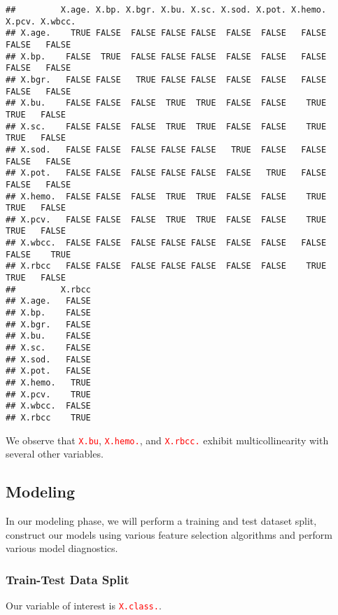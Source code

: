 \documentclass[
]{article}
\newenvironment{Shaded}{\begin{snugshade}}{\end{snugshade}}
\newcommand{\FunctionTok}[1]{\textcolor[rgb]{0.00,0.00,0.00}{#1}}
\newcommand{\NormalTok}[1]{#1}
\newcommand{\SpecialCharTok}[1]{\textcolor[rgb]{0.00,0.00,0.00}{#1}}
\begin{document}
\begin{verbatim}
##         X.age. X.bp. X.bgr. X.bu. X.sc. X.sod. X.pot. X.hemo. X.pcv. X.wbcc.
## X.age.    TRUE FALSE  FALSE FALSE FALSE  FALSE  FALSE   FALSE  FALSE   FALSE
## X.bp.    FALSE  TRUE  FALSE FALSE FALSE  FALSE  FALSE   FALSE  FALSE   FALSE
## X.bgr.   FALSE FALSE   TRUE FALSE FALSE  FALSE  FALSE   FALSE  FALSE   FALSE
## X.bu.    FALSE FALSE  FALSE  TRUE  TRUE  FALSE  FALSE    TRUE   TRUE   FALSE
## X.sc.    FALSE FALSE  FALSE  TRUE  TRUE  FALSE  FALSE    TRUE   TRUE   FALSE
## X.sod.   FALSE FALSE  FALSE FALSE FALSE   TRUE  FALSE   FALSE  FALSE   FALSE
## X.pot.   FALSE FALSE  FALSE FALSE FALSE  FALSE   TRUE   FALSE  FALSE   FALSE
## X.hemo.  FALSE FALSE  FALSE  TRUE  TRUE  FALSE  FALSE    TRUE   TRUE   FALSE
## X.pcv.   FALSE FALSE  FALSE  TRUE  TRUE  FALSE  FALSE    TRUE   TRUE   FALSE
## X.wbcc.  FALSE FALSE  FALSE FALSE FALSE  FALSE  FALSE   FALSE  FALSE    TRUE
## X.rbcc   FALSE FALSE  FALSE FALSE FALSE  FALSE  FALSE    TRUE   TRUE   FALSE
##         X.rbcc
## X.age.   FALSE
## X.bp.    FALSE
## X.bgr.   FALSE
## X.bu.    FALSE
## X.sc.    FALSE
## X.sod.   FALSE
## X.pot.   FALSE
## X.hemo.   TRUE
## X.pcv.    TRUE
## X.wbcc.  FALSE
## X.rbcc    TRUE
\end{verbatim}

We observe that \textcolor{red}{\texttt{X.bu}},
\textcolor{red}{\texttt{X.hemo.}}, and \textcolor{red}{\texttt{X.rbcc.}}
exhibit multicollinearity with several other variables.

\hypertarget{modeling}{%
\subsection{Modeling}\label{modeling}}

In our modeling phase, we will perform a training and test dataset
split, construct our models using various feature selection algorithms
and perform various model diagnostics.

\hypertarget{train-test-data-split}{%
\subsubsection{Train-Test Data Split}\label{train-test-data-split}}

Our variable of interest is \textcolor{red}{\texttt{X.class.}}.

\begin{Shaded}
\end{Shaded}
\end{document}

